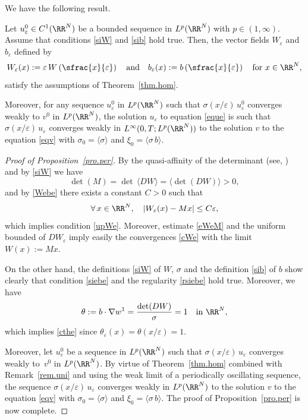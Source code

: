 We have the following result.
\begin{Pro}\label{pro.per}
Let $u_\varepsilon^0\in C^1(\RR^N)$ be a bounded sequence in $L^p(\RR^N)$ with $p\in(1,\infty)$.
Assume that conditions \eqref{siW} and \eqref{sib} hold true.
Then, the vector fields $W_\varepsilon$ and $b_\varepsilon$ defined by
\begin{equation}\label{Webe}
W_\varepsilon(x):=\varepsilon\,W\left(\sfrac{x}{\varepsilon}\right)\quad\mbox{and}\quad b_\varepsilon(x):=b\left(\sfrac{x}{\varepsilon}\right)\quad\mbox{for }x\in\RR^N,
\end{equation}
satisfy the assumptions of Theorem~\ref{thm.hom}.

Moreover, for any sequence $u_\varepsilon^0$ in $L^p(\RR^N)$ such that $\sigma(x/\varepsilon)\,u_\varepsilon^0$ converges weakly to $v^0$ in $L^p(\RR^N)$, the solution $u_\varepsilon$ to equation \eqref{eque} is such that $\sigma(x/\varepsilon)\,u_\varepsilon$ converges weakly in $L^\infty(0,T;L^p(\RR^N))$ to the solution $v$ to the equation \eqref{eqv} with $\sigma_0=\langle\sigma\rangle$ and $\xi_0=\langle\sigma\,b\rangle$.
\end{Pro}

\begin{proof}[Proof of Proposition~\ref{pro.per}]
By the quasi-affinity of the determinant (see, \eg \cite[\S 4.3.2]{Dac}) and by \eqref{siW} we have
\[
\det(M)=\det\,\langle DW\rangle=\big\langle \det(DW)\big\rangle >0,
\]
and by \eqref{Webe} there exists a constant $C>0$ such that
\begin{equation}\label{eWeM}
\forall\,x\in\RR^N,\quad |W_\varepsilon(x)-Mx| \leq C\varepsilon,
\end{equation}
which implies condition \eqref{upWe}.
Moreover, estimate \eqref{eWeM} and the uniform bounded of $DW_\varepsilon$ imply easily the convergences \eqref{cWe} with the limit $W(x):=Mx$.

On the other hand, the definitions \eqref{siW} of $W$, $\sigma$ and the definition \eqref{sib} of $b$ show clearly that condition \eqref{siebe} and the regularity \eqref{rsiebe} hold true.
Moreover, we have
\[
\theta:=b\cdot\nabla w^1= \dfrac{\det(DW)}{\sigma}=1\quad\mbox{in }\RR^N,
\]
which implies \eqref{cthe} since $\theta_\varepsilon(x)=\theta(x/\varepsilon)=1$.

Moreover, let $u_\varepsilon^0$ be a sequence in $L^p(\RR^N)$ such that $\sigma(x/\varepsilon)\,u_\varepsilon$ converges weakly to~$v^0$ in $L^p(\RR^N)$. By virtue of Theorem~\ref{thm.hom} combined with Remark~\ref{rem.uni} and using the weak limit of a periodically oscillating sequence, the sequence $\sigma(x/\varepsilon)\,u_\varepsilon$ converges weakly in $L^p(\RR^N)$ to the solution $v$ to the equation \eqref{eqv} with $\sigma_0=\langle\sigma\rangle$ and $\xi_0=\langle\sigma\,b\rangle$.
The proof of Proposition~\ref{pro.per} is now complete.
\end{proof}

